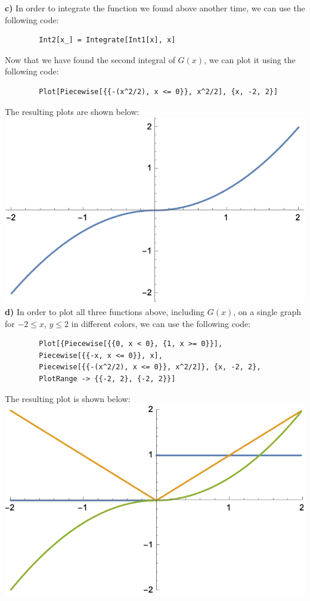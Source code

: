 \documentclass{article}
\begin{document}
    \textbf{c)} In order to integrate the function we found above another time, we can use the following code: \\
    \begin{verbatim}
        Int2[x_] = Integrate[Int1[x], x]
    \end{verbatim}
    Now that we have found the second integral of $G(x)$, we can plot it using the following code: \\
    \begin{verbatim}
        Plot[Piecewise[{{-(x^2/2), x <= 0}}, x^2/2], {x, -2, 2}]
    \end{verbatim}
    The resulting plots are shown below: \\
    \includegraphics[scale=0.5]{2.2.2c.png} \\

    \textbf{d)} In order to plot all three functions above, including $G(x)$, on a single graph for $-2 \leq x$, $y \leq 2$ in different colors, we can use the following code: \\
    \begin{verbatim}
        Plot[{Piecewise[{{0, x < 0}, {1, x >= 0}}], 
        Piecewise[{{-x, x <= 0}}, x], 
        Piecewise[{{-(x^2/2), x <= 0}}, x^2/2]}, {x, -2, 2}, 
        PlotRange -> {{-2, 2}, {-2, 2}}]
    \end{verbatim}

    The resulting plot is shown below: \\
    \includegraphics[scale=0.5]{2.2.2d.png} \\
\end{document}
